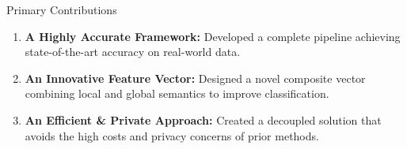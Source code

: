 \documentclass[aspectratio=169,10pt]{beamer}
\begin{document}
\begin{frame}
\begin{columns}[T]
        \begin{column}{0.47\textwidth}
            \begin{block}{Primary Contributions}
                \hfill
                \begin{enumerate}
                    \item<2-> \textbf{A Highly Accurate Framework:} Developed a complete pipeline achieving state-of-the-art accuracy on real-world data.\vspace{0.5em}
                    \item<3-> \textbf{An Innovative Feature Vector:} Designed a novel composite vector combining local and global semantics to improve classification.\vspace{0.5em}
                    \item<4-> \textbf{An Efficient \& Private Approach:} Created a decoupled solution that avoids the high costs and privacy concerns of prior methods.\vspace{1em}
                \end{enumerate}
            \end{block}
        \end{column}
    \end{columns}
    
    
\end{frame}



    
    
\end{document}
